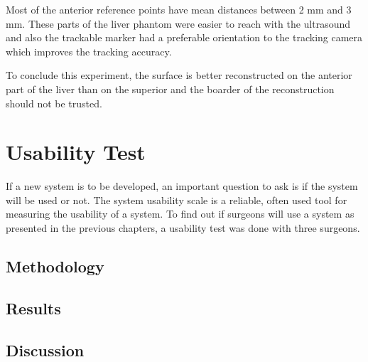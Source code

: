 Most of the anterior reference points have mean distances between 2 mm and 3 mm.
These parts of the liver phantom were easier to reach with the ultrasound and
also the trackable marker had a preferable orientation to the tracking camera
which improves the tracking accuracy.

To conclude this experiment, the surface is better reconstructed on the anterior
part of the liver than on the superior and the boarder of the reconstruction should
not be trusted. 


\section{Usability Test}
If a new system is to be developed, an important question to ask is if the
system will be used or not.
The system usability scale is a reliable, often used tool for measuring the
usability of a system. 
To find out if surgeons will use a system as presented in the previous chapters,
a usability test was done with three surgeons.
\subsection{Methodology}

\subsection{Results}
\subsection{Discussion}






